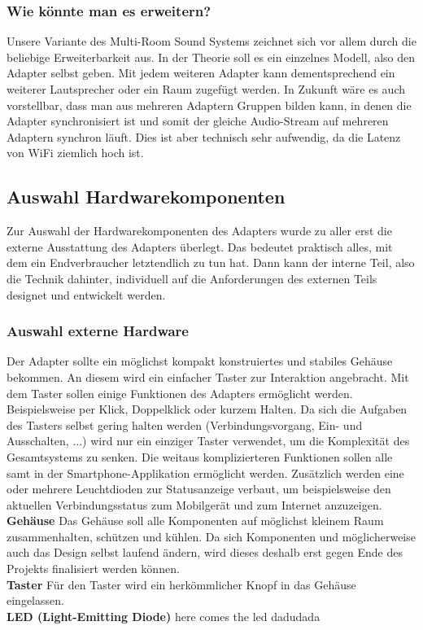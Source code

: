 \documentclass[]{article}
\begin{document}
\subsubsection{Wie könnte man es erweitern?}
Unsere Variante des Multi-Room Sound Systems zeichnet sich vor allem durch die beliebige Erweiterbarkeit aus. In der Theorie soll es ein einzelnes Modell, also den Adapter selbst geben. Mit jedem weiteren Adapter kann dementsprechend ein weiterer Lautsprecher oder ein Raum zugefügt werden. In Zukunft wäre es auch vorstellbar, dass man aus mehreren Adaptern Gruppen bilden kann, in denen die Adapter synchronisiert ist und somit der gleiche Audio-Stream auf mehreren Adaptern synchron läuft. Dies ist aber technisch sehr aufwendig, da die Latenz von WiFi ziemlich hoch ist.
\subsection{Auswahl Hardwarekomponenten}
Zur Auswahl der Hardwarekomponenten des Adapters wurde zu aller erst die externe Ausstattung des Adapters überlegt. Das bedeutet praktisch alles, mit dem ein Endverbraucher letztendlich zu tun hat. Dann kann der interne Teil, also die Technik dahinter, individuell auf die Anforderungen des externen Teils designet und entwickelt werden.
\subsubsection{Auswahl externe Hardware}
Der Adapter sollte ein möglichst kompakt konstruiertes und stabiles Gehäuse bekommen. An diesem wird ein einfacher Taster zur Interaktion angebracht. Mit dem Taster sollen einige Funktionen des Adapters ermöglicht werden. Beispielsweise per Klick, Doppelklick oder kurzem Halten. Da sich die Aufgaben des Tasters selbst gering halten werden (Verbindungsvorgang, Ein- und Ausschalten, ...) wird nur ein einziger Taster verwendet, um die Komplexität des Gesamtsystems zu senken. Die weitaus komplizierteren Funktionen sollen alle samt in der Smartphone-Applikation ermöglicht werden. Zusätzlich werden eine oder mehrere Leuchtdioden zur Statusanzeige verbaut, um beispielsweise den aktuellen Verbindungsstatus zum Mobilgerät und zum Internet anzuzeigen. \newline \\
\textbf{Gehäuse} \newline
Das Gehäuse soll alle Komponenten auf möglichst kleinem Raum zusammenhalten, schützen und kühlen. Da sich Komponenten und möglicherweise auch das Design selbst laufend ändern, wird dieses deshalb erst gegen Ende des Projekts finalisiert werden können. \newline \\
\textbf{Taster} \newline
Für den Taster wird ein herkömmlicher Knopf in das Gehäuse eingelassen.  \newline \\
\textbf{LED (Light-Emitting Diode)} \newline
here comes the led dadudada
\end{document}
